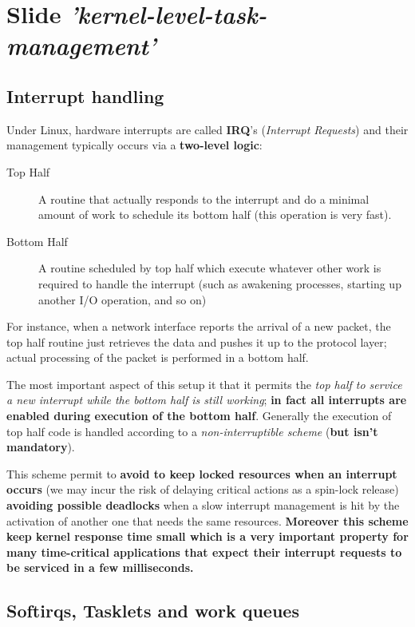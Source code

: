 \documentclass[10pt,a4paper]{article}
\begin{document}
\newpage
\section{Slide \textit{'kernel-level-task-management'}}

\subsection{Interrupt handling}

Under Linux, hardware interrupts are called \textbf{IRQ}'s (\textit{Interrupt Requests}) and their management  typically occurs via a \textbf{two-level logic}:
\begin{description}
\item[Top Half] A routine that actually responds to the interrupt and do a minimal amount of work to schedule its bottom half (this operation is very fast).
\item[Bottom Half] A routine scheduled by top half which execute whatever other work is required to handle the interrupt (such as awakening processes, starting up another I/O operation, and so on)
\end{description}

For instance, when a network interface reports the arrival of a new packet, the top half routine just retrieves the data and pushes it up to the protocol layer; actual processing of the packet is performed in a bottom half.

The most important aspect of this setup it that it permits the \textit{top half to service a new interrupt while the bottom half is still working}; \textbf{in fact all interrupts are enabled during execution of the bottom half}. Generally the execution of top half code is handled according to a \textit{non-interruptible scheme} (\textbf{but isn't mandatory}). 

This scheme permit to \textbf{avoid to keep locked resources when an interrupt occurs} (we may incur the risk of delaying critical actions as a spin-lock release) \textbf{avoiding possible deadlocks} when a slow interrupt management is hit by the activation of another one that needs the same resources. \textbf{Moreover this scheme keep
kernel response time small which is a very important property for many time-critical applications that expect their interrupt requests to be serviced in a few milliseconds.}

\subsection{Softirqs, Tasklets and work queues}
\end{document}
